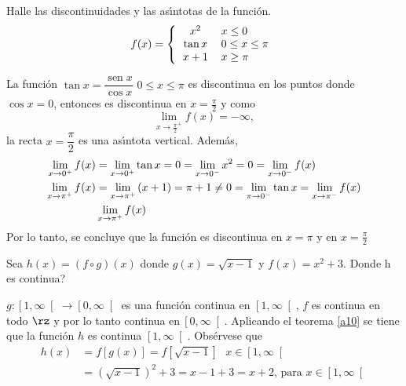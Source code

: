\begin{example}
Halle las discontinuidades y las as\'{\i}ntotas de la funci\'{o}n.
\[
f(x)=\left\{
\begin{tabular}
[c]{cl}%
$x^{2}$ & $x\leq0$\\
$\tan x$ & $0\leq x\leq\pi$\\
$x+1$ & $x\geq\pi$%
\end{tabular}
\right.
\]

\end{example}

\begin{sol}
La funci\'{o}n $\tan x=\dfrac{\operatorname{sen}x}{\cos x}$ $0\leq x\leq\pi$
es discontinua en los puntos donde $\cos x=0$, entonces es discontinua en
$x=\frac{\pi}{2}$ y como
\[
\lim_{x\rightarrow\frac{\pi}{2}^{+}}f(x)=-\infty,
\]
la recta $x=\dfrac{\pi}{2}$ es una as\'{\i}ntota vertical. Adem\'{a}s,
\begin{align*}
\lim_{x\rightarrow0^{+}}f(x)  &  =\lim_{x\rightarrow0^{+}}\tan x=0=\lim
_{x\rightarrow0^{-}}x^{2}=0=\lim_{x\rightarrow0^{-}}f(x)\\
\smallskip\lim_{x\rightarrow\pi^{+}}f(x)  &  =\lim_{x\rightarrow\pi^{+}%
}\left(  x+1\right)  =\pi+1\neq0=\lim_{\pi\rightarrow0^{-}}\tan x=\lim
_{x\rightarrow\pi^{-}}f(x)\\
&  \lim_{x\rightarrow\pi^{+}}f(x)
\end{align*}
Por lo tanto, se concluye que la funci\'{o}n es discontinua en $x=\pi$ y en
$x=\frac{\pi}{2}$
\end{sol}

\begin{example}
Sea $h\left(  x\right)  =\left(  f\circ g\right)  \left(  x\right)  $ donde
$g(x)=\sqrt{x-1}$ y $f\left(  x\right)  =x^{2}+3.$ \textquestiondown Donde h
es continua?
\end{example}

\begin{sol}
$g:\left[  1,\infty\right[  \rightarrow\left[  0,\infty\right[  $ es una
funci\'{o}n continua en $\left[  1,\infty\right[  $, $f$ es continua en todo
$\rz$ y por lo tanto continua en$\ \left[  0,\infty\right[  $. Aplicando el
teorema \ref{a10} se tiene que la funci\'{o}n $h$ es continua $\left[
1,\infty\right[  .$ Obs\'{e}rvese que%
\begin{align*}
h\left(  x\right)   &  =f[g(x)]=f[\sqrt{x-1}]\text{ }x\in\left[
1,\infty\right[ \\
&  =\left(  \sqrt{x-1}\right)  ^{2}+3=x-1+3=x+2\text{, para }x\in\left[
1,\infty\right[
\end{align*}

\end{sol}

